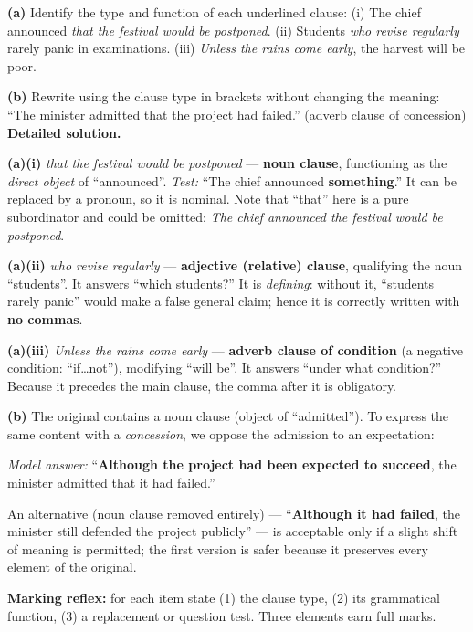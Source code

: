 \documentclass[11pt]{article}
\begin{document}
\begin{exoresolu}
\textbf{(a)} Identify the type and function of each underlined clause:
(i) The chief announced \emph{that the festival would be postponed}.
(ii) Students \emph{who revise regularly} rarely panic in examinations.
(iii) \emph{Unless the rains come early}, the harvest will be poor.

\textbf{(b)} Rewrite using the clause type in brackets without changing the meaning: ``The minister admitted that the project had failed.'' (adverb clause of concession)
\tcblower
\textbf{Detailed solution.}

\textbf{(a)(i)} \emph{that the festival would be postponed} — \textbf{noun clause}, functioning as the \emph{direct object} of ``announced''. \emph{Test:} ``The chief announced \textbf{something}.'' It can be replaced by a pronoun, so it is nominal. Note that ``that'' here is a pure subordinator and could be omitted: \emph{The chief announced the festival would be postponed}.

\textbf{(a)(ii)} \emph{who revise regularly} — \textbf{adjective (relative) clause}, qualifying the noun ``students''. It answers ``which students?'' It is \emph{defining}: without it, ``students rarely panic'' would make a false general claim; hence it is correctly written with \textbf{no commas}.

\textbf{(a)(iii)} \emph{Unless the rains come early} — \textbf{adverb clause of condition} (a negative condition: ``if\ldots not''), modifying ``will be''. It answers ``under what condition?'' Because it precedes the main clause, the comma after it is obligatory.

\textbf{(b)} The original contains a noun clause (object of ``admitted''). To express the same content with a \emph{concession}, we oppose the admission to an expectation:

\emph{Model answer:} ``\textbf{Although the project had been expected to succeed}, the minister admitted that it had failed.''

An alternative (noun clause removed entirely) — ``\textbf{Although it had failed}, the minister still defended the project publicly'' — is acceptable only if a slight shift of meaning is permitted; the first version is safer because it preserves every element of the original.

\textbf{Marking reflex:} for each item state (1) the clause type, (2) its grammatical function, (3) a replacement or question test. Three elements earn full marks.
\end{exoresolu}
\end{document}
